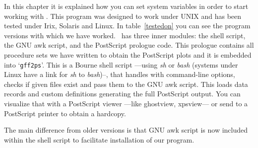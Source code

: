 %
%
%
%

	
In this chapter it is explained how you can set system variables in order to start working with \prog. This program was designed to work under UNIX and has been tested under Irix, Solaris and Linux. In table~\ref{testedon} you can see the program versions with which we have worked. \prog\ has three inner modules: the shell script, the GNU awk script, and the PostScript prologue code. This prologue contains all procedure sets we have written to obtain the PostScript plots and it is embedded into `\texttt{gff2ps}'. This is a Bourne shell script ---using \textit{sh} or \textit{bash} (systems under Linux have a link for \textit{sh} to \textit{bash})--, that handles with command-line options, checks if given files exist and pass them to the GNU awk script. This loads data records and custom definitions generating the full PostScript output. You can visualize that with a PostScript viewer ---like ghostview, xpsview--- or send to a PostScript printer to obtain a hardcopy.\par

The main difference from older versions is that GNU awk script is now included within the shell script to facilitate installation of our program.\par

%	

%	

%	
